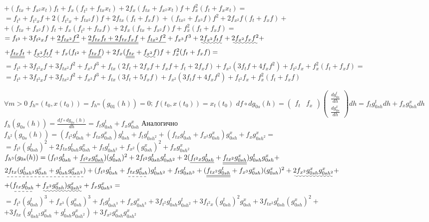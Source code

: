 \documentclass[a4paper,14pt]{article}
\begin{document}
$+(f_{tx}+f_{x^2}x_t)f_t+f_x(f_{t^2}+f_{tx}x_t)+2f_x(f_{tx}+f_{x^2}x_t)f+f_x^2(f_t+f_xx_t)=$\newline
%
$=f_{t^3}+f_{t^2x}f+2(f_{t^2x}+f_{tx^2}f)f+2f_{tx}(f_t+f_xf)+(f_{tx^2}+f_{x^3}f)f^2+2f_{x^2}f(f_t+f_xf)+$\newline
$+(f_{tx}+f_{x^2}f)f_t+f_x(f_{t^2}+f_{tx}f)+2f_x(f_{tx}+f_{x^2}f)f+f_x^2(f_t+f_xf)=$\newline
$=f_{t^3}+3f_{t^2x}f+\underline{2f_{tx^2}f^2}+\underline{\underline{2f_{tx}f_t+2f_{tx}f_xf}}+\underline{f_{tx^2}f^2}+f_{x^3}f^3+\uwave{2f_{x^2}f_tf}+\uwave{2f_{x^2}f_xf^2}+$\newline
$+\underline{\underline{f_{tx}f_t}}+\uwave{f_{x^2}f_tf}+f_x(f_{t^2}+\underline{\underline{f_{tx}f}})+2f_x(\underline{\underline{f_{tx}}}+\uwave{f_{x^2}f})f+f_x^2(f_t+f_xf)=$\newline
$=f_{t^3}+3f_{t^2x}f+3f_{tx^2}f^2+f_{x^3}f^3+f_{tx}(2f_t+2f_xf+f_xf+f_t+2f_xf)+f_{x^2}(3f_tf+4f_xf^2)+f_{t^2}f_{x}+f_x^2(f_t+f_xf)=$\newline
$=f_{t^3}+3f_{t^2x}f+3f_{tx^2}f^2+f_{x^3}f^3+f_{tx}(3f_t+5f_xf)+f_{x^2}(3f_tf+4f_xf^2)+f_{t^2}f_{x}+f_x^2(f_t+f_xf)$\newline

$\forall m>0\  f_{h^m}(t_0,x(t_0))=f_{h^m}(g_{01}(h))=0$; $f(t_0,x(t_0))=x_t(t_0)$\newline
$df\circ dg_{0s}(h)=\begin{pmatrix} f_t & f_x\end{pmatrix}\begin{pmatrix} \frac{dg_{0s}^t}{dh} \\ \frac{dg_{0s}^x}{dh}\end{pmatrix}dh=f_tg_{0sh}^tdh+f_xg_{0sh}^xdh$\newline
$f_h(g_{0s}(h))=\frac{df\circ dg_{0s}(h)}{dh}=f_tg_{0sh}^t+f_xg_{0sh}^x$\newline
Аналогично $f_{h^2}(g_{0s}(h))=(f_{t^2}g_{0sh}^t+f_{tx}g_{0sh}^x)g_{0sh}^t+f_tg_{0sh^2}^t+(f_{tx}g_{0sh}^t+f_{x^2}g_{0sh}^x)g_{0sh}^x+f_xg_{0sh^2}^x=$\newline
$=f_{t^2}(g_{0sh}^t)^2+2f_{tx}g_{0sh}^tg_{0sh}^x+f_tg_{0sh^2}^t+f_{x^2}(g_{0sh}^x)^2+f_xg_{0sh^2}^x$\newline
$f_{h^3}(g_{0s}(h))=(f_{t^3}g_{0sh}^t+\uline{f_{t^2x}g_{0sh}^x})(g_{0sh}^t)^2+2f_{t^2}g_{0sh}^tg_{0sh^2}^t+2(\uline{f_{t^2x}g_{0sh}^t}+\uline{\uline{f_{tx^2}g_{0sh}^x}})g_{0sh}^tg_{0sh}^x+$\newline
$\dashuline{2f_{tx}(g_{0sh^2}^tg_{0sh}^x+g_{0sh}^tg_{0sh^2}^x)}+(f_{t^2}g_{0sh}^t+\dashuline{f_{tx}g_{0sh}^x})g_{0sh^2}^t+f_tg_{0sh^3}^t+(\uline{\uline{f_{tx^2}g_{0sh}^t}}+f_{x^3}g_{0sh}^x)(g_{0sh}^x)^2+\uwave{2f_{x^2}g_{0sh}^xg_{0sh^2}^x}+$\newline
$+(\dashuline{f_{tx}g_{0sh}^t}+\uwave{f_{x^2}g_{0sh}^x)g_{0sh^2}^x}+f_xg_{0sh^3}^x=$\newline
$=f_{t^3}(g_{0sh}^t)^3+f_{x^3}(g_{0sh}^x)^3+f_tg_{0sh^3}^t+f_xg_{0sh^3}^x+3f_{t^2}g_{0sh}^tg_{0sh^2}^t+3f_{t^2x}(g_{0sh}^t)^2g_{0sh}^x+3f_{tx^2}g_{0sh}^t(g_{0sh}^x)^2+$\newline
$+3f_{tx}(g_{0sh^2}^tg_{0sh}^x+g_{0sh}^tg_{0sh^2}^x)+3f_{x^2}g_{0sh}^xg_{0sh^2}^x$\newline
\end{document}
